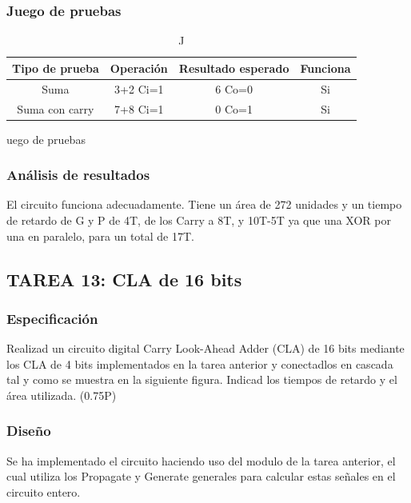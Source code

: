 \documentclass{article}
\begin{document}
		\subsubsection*{Juego de pruebas}
		\begin{table}[h]
			\begin{center}
				\begin{tabular}{| c | c | c | c |}
					\hline
					Tipo de prueba & Operación & Resultado esperado & Funciona \\ \hline
				
					Suma & 3+2 Ci=1 & 6 Co=0 & Si \\ \hline
					Suma con carry & 7+8 Ci=1 & 0 Co=1 & Si \\ \hline
			
				\end{tabular}
				\caption Juego de pruebas
			\end{center}
		\end{table}



		\subsubsection*{Análisis de resultados}
		El circuito funciona adecuadamente. Tiene un área de 272 unidades y un tiempo de retardo de G y P de 4T, de los Carry a 8T, y 10T-5T ya que una XOR por una en paralelo, para un total de 17T.


	\subsection{TAREA 13: CLA de 16 bits}
		\subsubsection*{Especificación}
Realizad un circuito digital Carry Look-Ahead Adder (CLA) de 16 bits mediante los
CLA de 4 bits implementados en la tarea anterior y conectadlos en cascada tal y como se muestra en
la siguiente figura. Indicad los tiempos de retardo y el área utilizada. (0.75P)


		\subsubsection*{Diseño}
		Se ha implementado el circuito haciendo uso del modulo de la tarea anterior, el cual utiliza los Propagate y Generate generales para calcular estas señales en el circuito entero.
\end{document}
